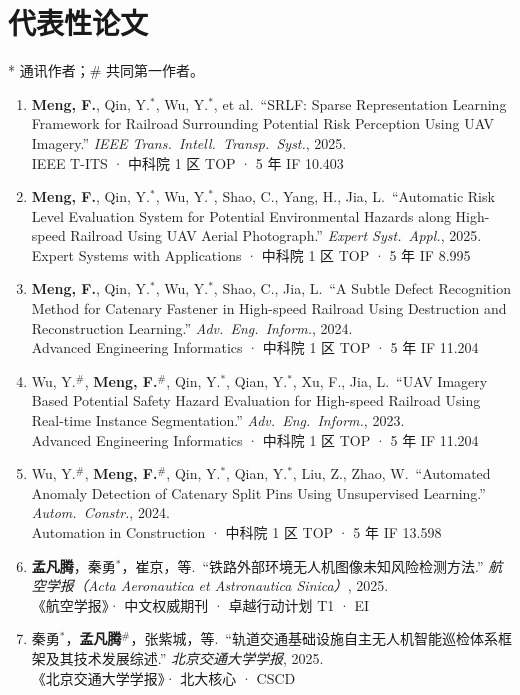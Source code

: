 \documentclass[10.5pt,a4paper]{ctexart}
\begin{document}
\section{代表性论文}
{\footnotesize\sffamily\color{navy}* 通讯作者；\# 共同第一作者。}
\begin{enumerate}[label=\arabic*.,labelsep=0.5em,leftmargin=1.9em,itemsep=4pt,topsep=3pt]
  \item \textbf{Meng, F.}, Qin, Y.$^*$, Wu, Y.$^*$, et al.\ ``SRLF: Sparse Representation Learning Framework for Railroad Surrounding Potential Risk Perception Using UAV Imagery.'' \textit{IEEE Trans.\ Intell.\ Transp.\ Syst.}, 2025.\\
  {\footnotesize\color{graytext}IEEE T-ITS · 中科院 1 区 TOP · 5 年 IF 10.403}
  \item \textbf{Meng, F.}, Qin, Y.$^*$, Wu, Y.$^*$, Shao, C., Yang, H., Jia, L.\ ``Automatic Risk Level Evaluation System for Potential Environmental Hazards along High-speed Railroad Using UAV Aerial Photograph.'' \textit{Expert Syst.\ Appl.}, 2025.\\
  {\footnotesize\color{graytext}Expert Systems with Applications · 中科院 1 区 TOP · 5 年 IF 8.995}
  \item \textbf{Meng, F.}, Qin, Y.$^*$, Wu, Y.$^*$, Shao, C., Jia, L.\ ``A Subtle Defect Recognition Method for Catenary Fastener in High-speed Railroad Using Destruction and Reconstruction Learning.'' \textit{Adv.\ Eng.\ Inform.}, 2024.\\
  {\footnotesize\color{graytext}Advanced Engineering Informatics · 中科院 1 区 TOP · 5 年 IF 11.204}
  \item Wu, Y.$^\#$, \textbf{Meng, F.}$^\#$, Qin, Y.$^*$, Qian, Y.$^*$, Xu, F., Jia, L.\ ``UAV Imagery Based Potential Safety Hazard Evaluation for High-speed Railroad Using Real-time Instance Segmentation.'' \textit{Adv.\ Eng.\ Inform.}, 2023.\\
  {\footnotesize\color{graytext}Advanced Engineering Informatics · 中科院 1 区 TOP · 5 年 IF 11.204}
  \item Wu, Y.$^\#$, \textbf{Meng, F.}$^\#$, Qin, Y.$^*$, Qian, Y.$^*$, Liu, Z., Zhao, W.\ ``Automated Anomaly Detection of Catenary Split Pins Using Unsupervised Learning.'' \textit{Autom.\ Constr.}, 2024.\\
  {\footnotesize\color{graytext}Automation in Construction · 中科院 1 区 TOP · 5 年 IF 13.598}
  \item \textbf{孟凡腾}，秦勇$^{*}$，崔京，等.\ ``铁路外部环境无人机图像未知风险检测方法.'' \textit{航空学报（Acta Aeronautica et Astronautica Sinica）}, 2025.\\
  {\footnotesize\color{graytext}《航空学报》· 中文权威期刊 · 卓越行动计划 T1 · EI}
  \item 秦勇$^{*}$，\textbf{孟凡腾}$^{\#}$，张紫城，等.\ ``轨道交通基础设施自主无人机智能巡检体系框架及其技术发展综述.'' \textit{北京交通大学学报}, 2025.\\
  {\footnotesize\color{graytext}《北京交通大学学报》· 北大核心 · CSCD}
\end{enumerate}
\end{document}
